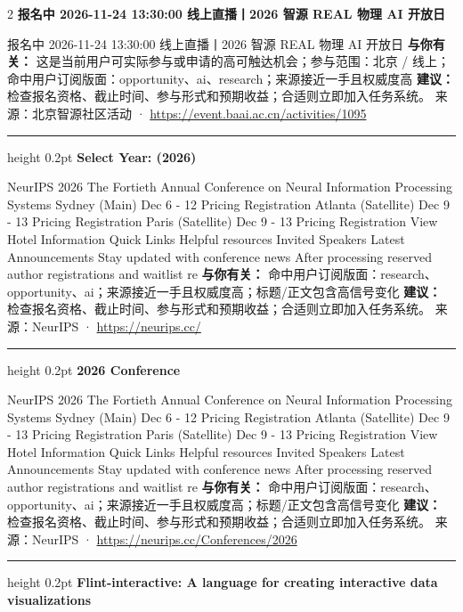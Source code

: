 \documentclass[10.5pt]{ctexart}
\begin{document}
\begin{multicols}{2}
{\large\bfseries 报名中 2026-11-24 13:30:00 线上直播丨2026 智源 REAL 物理 AI 开放日}\par
报名中 2026-11-24 13:30:00 线上直播丨2026 智源 REAL 物理 AI 开放日
\textbf{与你有关：} 这是当前用户可实际参与或申请的高可触达机会；参与范围：北京 / 线上；命中用户订阅版面：opportunity、ai、research；来源接近一手且权威度高
\textbf{建议：} 检查报名资格、截止时间、参与形式和预期收益；合适则立即加入任务系统。
{\footnotesize\color{ormuted} 来源：北京智源社区活动 · \url{https://event.baai.ac.cn/activities/1095}}
\vspace{2mm}
\hrule height 0.2pt
\vspace{2mm}
{\large\bfseries Select Year: (2026)}\par
NeurIPS 2026 The Fortieth Annual Conference on Neural Information Processing Systems Sydney (Main) Dec 6 - 12 Pricing Registration Atlanta (Satellite) Dec 9 - 13 Pricing Registration Paris (Satellite) Dec 9 - 13 Pricing Registration View Hotel Information Quick Links Helpful resources Invited Speakers Latest Announcements Stay updated with conference news After processing reserved author registrations and waitlist re
\textbf{与你有关：} 命中用户订阅版面：research、opportunity、ai；来源接近一手且权威度高；标题/正文包含高信号变化
\textbf{建议：} 检查报名资格、截止时间、参与形式和预期收益；合适则立即加入任务系统。
{\footnotesize\color{ormuted} 来源：NeurIPS · \url{https://neurips.cc/}}
\vspace{2mm}
\hrule height 0.2pt
\vspace{2mm}
{\large\bfseries 2026 Conference}\par
NeurIPS 2026 The Fortieth Annual Conference on Neural Information Processing Systems Sydney (Main) Dec 6 - 12 Pricing Registration Atlanta (Satellite) Dec 9 - 13 Pricing Registration Paris (Satellite) Dec 9 - 13 Pricing Registration View Hotel Information Quick Links Helpful resources Invited Speakers Latest Announcements Stay updated with conference news After processing reserved author registrations and waitlist re
\textbf{与你有关：} 命中用户订阅版面：research、opportunity、ai；来源接近一手且权威度高；标题/正文包含高信号变化
\textbf{建议：} 检查报名资格、截止时间、参与形式和预期收益；合适则立即加入任务系统。
{\footnotesize\color{ormuted} 来源：NeurIPS · \url{https://neurips.cc/Conferences/2026}}
\vspace{2mm}
\hrule height 0.2pt
\vspace{2mm}
{\large\bfseries Flint-interactive: A language for creating interactive data visualizations}\par

\end{multicols}
\end{document}
